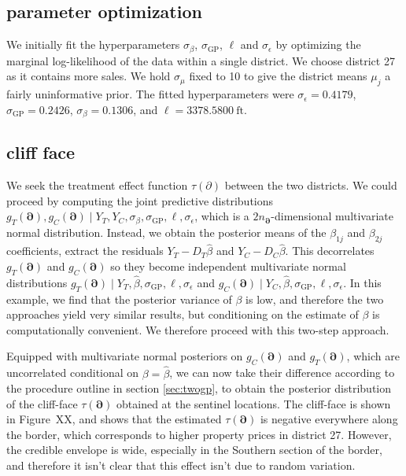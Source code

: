 \documentclass[letter]{article}
\newcommand{\sigmaf}{\sigma_{\mathrm{GP}}}
\newcommand{\sigman}{\sigma_{\epsilon}}
\newcommand{\boundary}{\partial}
\newcommand{\sentinels}{\bm{\boundary}}
\begin{document}
    	\subsection{parameter optimization}\label{parameter-optimization}

We initially fit the hyperparameters \(\sigma_\beta\), \(\sigmaf\), \(\ell\) and \(\sigman\) by optimizing the marginal log-likelihood of the data within a single district. We choose district 27 as it contains more sales. We hold \(\sigma_\mu\) fixed to 10 to give the district means \(\mu_j\) a fairly uninformative prior. The fitted hyperparameters were \(\sigman=0.4179\), \(\sigmaf=0.2426\), \(\sigma_\beta=0.1306\), and \(\ell=3378.5800~\text{ft}\).
    


    	\subsection{cliff face}\label{cliff-face}

We seek the treatment effect function \(\tau(\boundary)\) between the two districts. We could proceed by computing the joint predictive distributions \(g_T(\sentinels),g_C(\sentinels) \mid Y_T, Y_C, \sigma_\beta,\sigmaf,\ell,\sigman\), which is a \(2 n_{\sentinels}\)-dimensional multivariate normal distribution. Instead, we obtain the posterior means of the \(\beta_{1j}\) and \(\beta_{2j}\) coefficients, extract the residuals \(Y_T-D_T \hat{\beta}\) and \(Y_C-D_C \hat{\beta}\). This decorrelates \(g_T(\sentinels)\) and \(g_C(\sentinels)\) so they become independent multivariate normal distributions \(g_T(\sentinels) \mid Y_T, \hat\beta, \sigmaf,\ell,\sigman\) and \(g_C(\sentinels) \mid Y_C, \hat\beta, \sigmaf,\ell,\sigman\). In this example, we find that the posterior variance of \(\beta\) is low, and therefore the two approaches yield very similar results, but conditioning on the estimate of \(\beta\) is computationally convenient. We therefore proceed with this two-step approach.

Equipped with multivariate normal posteriors on \(g_C(\sentinels)\) and \(g_T(\sentinels)\), which are uncorrelated conditional on \(\beta=\hat\beta\), we can now take their difference according to the procedure outline in section \ref{sec:twogp}, to obtain the posterior distribution of the cliff-face \(\tau(\sentinels)\) obtained at the sentinel locations.
The cliff-face is shown in Figure~XX, and shows that the estimated \(\tau(\sentinels)\) is negative everywhere along the border, which corresponds to higher property prices in district 27.
However, the credible envelope is wide, especially in the Southern section of the border, and therefore it isn't clear that this effect isn't due to random variation.
\end{document}
